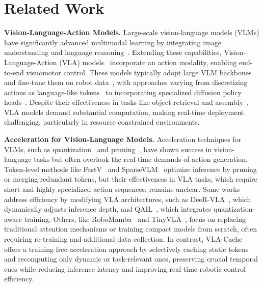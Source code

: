 \section{Related Work}
\textbf{Vision-Language-Action Models.}
Large-scale vision-language models (VLMs) have significantly advanced multimodal learning by integrating image understanding and language reasoning~\cite{liu2024visual, bai2023qwen}. Extending these capabilities, Vision-Language-Action (VLA) models~\cite{zitkovich2023rt,li2023vision} incorporate an action modality, enabling end-to-end visuomotor control. These models typically adopt large VLM backbones~\cite{touvron2023llama} and fine-tune them on robot data~\cite{o2024open}, with approaches varying from discretizing actions as language-like tokens~\cite{kim24openvla, chi2023diffusion} to incorporating specialized diffusion policy heads~\cite{black2024pi_0}. Despite their effectiveness in tasks like object retrieval and assembly~\cite{huang2024rekep, zhao2023learning}, VLA models demand substantial computation, making real-time deployment challenging, particularly in resource-constrained environments.

\textbf{Acceleration for Vision-Language Models.}
Acceleration techniques for VLMs, such as quantization~\cite{10.1145/3664647.3680838} and pruning~\cite{lin2024mope}, have shown success in vision-language tasks but often overlook the real-time demands of action generation. Token-level methods like FastV~\cite{chen2025image} and SparseVLM~\cite{zhang2024sparsevlm} optimize inference by pruning or merging redundant tokens, but their effectiveness in VLA tasks, which require short and highly specialized action sequences, remains unclear. Some works address efficiency by modifying VLA architectures, such as DeeR-VLA~\cite{DeeR-VLA}, which dynamically adjusts inference depth, and QAIL~\cite{park2024quantization}, which integrates quantization-aware training. Others, like RoboMamba~\cite{liu2024robomamba} and TinyVLA~\cite{wen2024tinyvla}, focus on replacing traditional attention mechanisms or training compact models from scratch, often requiring re-training and additional data collection. In contrast, VLA-Cache offers a training-free acceleration approach by selectively caching static tokens and recomputing only dynamic or task-relevant ones, preserving crucial temporal cues while reducing inference latency and improving real-time robotic control efficiency.

